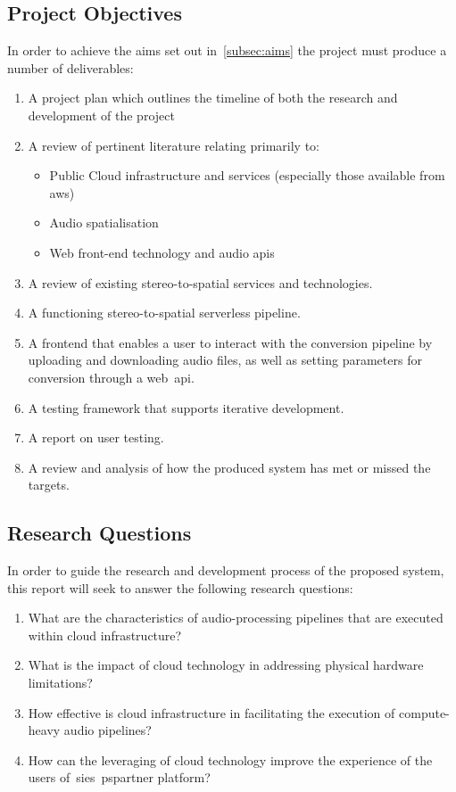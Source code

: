 \subsection{Project Objectives}\label{subsec:project-objectives}

In order to achieve the aims set out in~\ref{subsec:aims} the project must produce a number of deliverables:

\begin{enumerate}
    \item A project plan which outlines the timeline of both the research and development of the project
    \item A review of pertinent literature relating primarily to:
    \begin{itemize}
        \item Public Cloud infrastructure and services (especially those available from \gls{aws})
        \item Audio spatialisation
        \item Web front-end technology and audio \glspl{api}
    \end{itemize}
    \item A review of existing stereo-to-spatial services and technologies.
    \item A functioning stereo-to-spatial serverless pipeline.
    \item A frontend that enables a user to interact with the conversion pipeline by uploading and downloading audio files, as well as setting parameters for conversion through a web~\gls{api}.
    \item A testing framework that supports iterative development.
    \item A report on user testing.
    \item A review and analysis of how the produced system has met or missed the targets.
\end{enumerate}

\subsection{Research Questions}\label{subsec:research-questions}

In order to guide the research and development process of the proposed system, this report will seek to answer the following research questions:

\begin{enumerate}
    \item What are the characteristics of audio-processing pipelines that are executed within cloud infrastructure?
    \item What is the impact of cloud technology in addressing physical hardware limitations?
    \item How effective is cloud infrastructure in facilitating the execution of compute-heavy audio pipelines?
    \item How can the leveraging of cloud technology improve the experience of the users of~\glspl{sie}~\gls{pspartner} platform?

\end{enumerate}